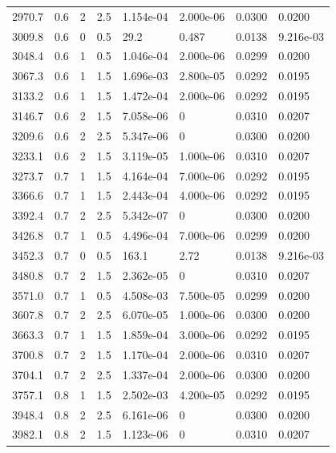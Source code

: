 \documentclass[preview]{standalone}
\begin{document}
{{{\begin{tabular}{L{1.2cm}C{1.2cm} C{0.3cm}C{0.5cm} C{1.4cm}C{1.4cm} C{1.4cm}C{1.4cm}}
  2970.7  &   0.6  & 2     & 2.5 &  1.154e-04  & 2.000e-06  & 0.0300 &  0.0200   \\ 
  3009.8  &   0.6  & 0     & 0.5 &  29.2  & 0.487  & 0.0138 &  9.216e-03   \\ 
  3048.4  &   0.6  & 1     & 0.5 &  1.046e-04  & 2.000e-06  & 0.0299 &  0.0200   \\ 
  3067.3  &   0.6  & 1     & 1.5 &  1.696e-03  & 2.800e-05  & 0.0292 &  0.0195   \\ 
  3133.2  &   0.6  & 1     & 1.5 &  1.472e-04  & 2.000e-06  & 0.0292 &  0.0195   \\ 
  3146.7  &   0.6  & 2     & 1.5 &  7.058e-06  & 0  & 0.0310 &  0.0207   \\ 
  3209.6  &   0.6  & 2     & 2.5 &  5.347e-06  & 0  & 0.0300 &  0.0200   \\ 
  3233.1  &   0.6  & 2     & 1.5 &  3.119e-05  & 1.000e-06  & 0.0310 &  0.0207   \\ 
  3273.7  &   0.7  & 1     & 1.5 &  4.164e-04  & 7.000e-06  & 0.0292 &  0.0195   \\ 
  3366.6  &   0.7  & 1     & 1.5 &  2.443e-04  & 4.000e-06  & 0.0292 &  0.0195   \\ 
  3392.4  &   0.7  & 2     & 2.5 &  5.342e-07  & 0  & 0.0300 &  0.0200   \\ 
  3426.8  &   0.7  & 1     & 0.5 &  4.496e-04  & 7.000e-06  & 0.0299 &  0.0200   \\ 
  3452.3  &   0.7  & 0     & 0.5 &  163.1  & 2.72  & 0.0138 &  9.216e-03   \\ 
  3480.8  &   0.7  & 2     & 1.5 &  2.362e-05  & 0  & 0.0310 &  0.0207   \\ 
  3571.0  &   0.7  & 1     & 0.5 &  4.508e-03  & 7.500e-05  & 0.0299 &  0.0200   \\ 
  3607.8  &   0.7  & 2     & 2.5 &  6.070e-05  & 1.000e-06  & 0.0300 &  0.0200   \\ 
  3663.3  &   0.7  & 1     & 1.5 &  1.859e-04  & 3.000e-06  & 0.0292 &  0.0195   \\ 
  3700.8  &   0.7  & 2     & 1.5 &  1.170e-04  & 2.000e-06  & 0.0310 &  0.0207   \\ 
  3704.1  &   0.7  & 2     & 2.5 &  1.337e-04  & 2.000e-06  & 0.0300 &  0.0200   \\ 
  3757.1  &   0.8  & 1     & 1.5 &  2.502e-03  & 4.200e-05  & 0.0292 &  0.0195   \\ 
  3948.4  &   0.8  & 2     & 2.5 &  6.161e-06  & 0  & 0.0300 &  0.0200   \\ 
  3982.1  &   0.8  & 2     & 1.5 &  1.123e-06  & 0  & 0.0310 &  0.0207   \\ 

\end{tabular}}}}
\end{document}
